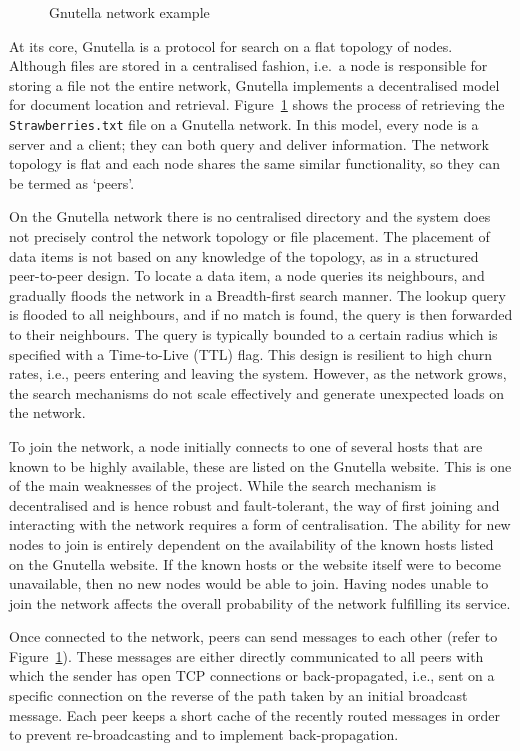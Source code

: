 \begin{figure}[ht]
    \centering
    
    \caption{Gnutella network example}
    \label{fig:gnutella}
\end{figure}

At its core, Gnutella is a protocol for search on a flat topology of nodes. Although files are stored in a centralised fashion, i.e.\ a node is responsible for storing a file not the entire network, Gnutella implements a decentralised model for document location and retrieval. Figure~\ref{fig:gnutella} shows the process of retrieving the \verb+Strawberries.txt+ file on a Gnutella network. In this model, every node is a server and a client; they can both query and deliver information. The network topology is flat and each node shares the same similar functionality, so they can be termed as `peers'.

On the Gnutella network there is no centralised directory and the system does not precisely control the network topology or file placement. The placement of data items is not based on any knowledge of the topology, as in a structured peer-to-peer design. To locate a data item, a node queries its neighbours, and gradually floods the network in a Breadth-first search manner. The lookup query is flooded to all neighbours, and if no match is found, the query is then forwarded to their neighbours. The query is typically bounded to a certain radius which is specified with a Time-to-Live (TTL) flag. This design is resilient to high churn rates, i.e., peers entering and leaving the system\cite{lua2005survey}. However, as the network grows, the search mechanisms do not scale effectively and generate unexpected loads on the network\cite{lua2005survey}.

To join the network, a node initially connects to one of several hosts that are known to be highly available, these are listed on the Gnutella website. This is one of the main weaknesses of the project. While the search mechanism is decentralised and is hence robust and fault-tolerant, the way of first joining and interacting with the network requires a form of centralisation. The ability for new nodes to join is entirely dependent on the availability of the known hosts listed on the Gnutella website. If the known hosts or the website itself were to become unavailable, then no new nodes would be able to join. Having nodes unable to join the network affects the overall probability of the network fulfilling its service.

Once connected to the network, peers can send messages to each other (refer to Figure~\ref{fig:gnutella}). These messages are either directly communicated to all peers with which the sender has open TCP connections or back-propagated, i.e., sent on a specific connection on the reverse of the path taken by an initial broadcast message. Each peer keeps a short cache of the recently routed messages in order to prevent re-broadcasting and to implement back-propagation.\cite{lua2005survey}

